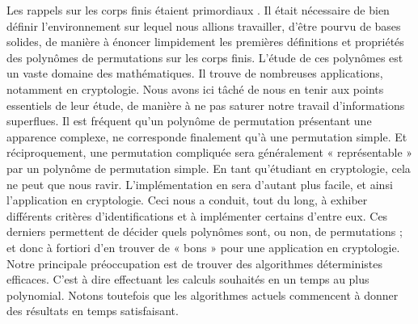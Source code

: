 \documentclass[12pt]{article}
\theoremstyle{remark}\newtheorem{note}{Note}
\theoremstyle{remark}\newtheorem{nota}{Notation}
\theoremstyle{definition}
\begin{document}
Les rappels sur les corps finis étaient primordiaux . Il était nécessaire de bien définir l'environnement sur lequel nous allions travailler, d’être pourvu de bases solides, de manière à énoncer limpidement les premières définitions et propriétés des polynômes de permutations sur les corps finis. L'étude de ces polynômes est un vaste domaine des mathématiques. Il trouve de nombreuses applications, notamment en cryptologie. Nous avons ici tâché de nous en tenir aux points essentiels de leur étude, de manière à ne pas saturer notre travail d’informations superflues. \newline
\break
Il est fréquent qu'un polynôme de permutation présentant une apparence complexe, ne corresponde finalement qu’à une permutation simple. Et réciproquement, une permutation compliquée sera généralement « représentable » par un polynôme de permutation simple. En tant qu’étudiant en cryptologie, cela ne peut que nous ravir. L’implémentation en sera d’autant plus facile, et ainsi l’application en cryptologie. \newline
Ceci nous a conduit, tout du long, à exhiber différents critères d’identifications et à implémenter certains d’entre eux. Ces derniers permettent de décider quels polynômes sont, ou non, de permutations ; et donc à fortiori d'en trouver de « bons » pour une application en cryptologie. \newline
Notre principale préoccupation est de trouver des algorithmes déterministes efficaces.  C’est à dire effectuant les calculs souhaités en un temps au plus polynomial. Notons toutefois que les algorithmes actuels commencent à donner des résultats en temps satisfaisant.\\

\pagebreak


\end{document}
